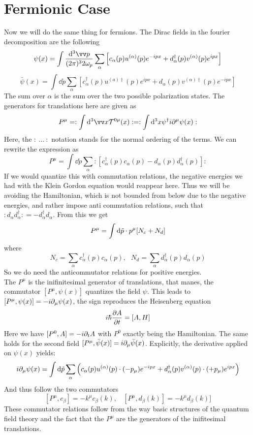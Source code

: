 \section{Fermionic Case}
Now we will do the same thing for fermions. 
The Dirac fields in the fourier decomposition are the following 
\[ \psi(x) = \int \frac{\dd ^3 \vp}{(2\pi)^3 2 \omega_p} \sum_\alpha \left[ c_\alpha(p) u^{(\alpha)}(p) e^{-ipx} + d_\alpha^\dagger(p) v^{(\alpha)}(p) e^{ipx}\right]\]
\[ \bar{\psi}(x) = \int \dd \tilde{p} \sum_\alpha \left[ c_\alpha^\dagger(p)u^{(a)\dagger}(p) e^{ipx} + d_\alpha(p) v^{(\alpha)\dagger}(p) e^{-ipx}\right] \]
The sum over $\alpha$ is the sum over the two possible polarization states.
The generators for translations here are given as
\[ P^\mu = : \int \dd^3\vx \mathcal{T}^{0\mu}(x) : = : \int \dd^3 x \psi^\dagger i \p^\mu \psi(x) :\]
Here, the $:~\ldots~:$ notation stands for the normal ordering of the terms. We can rewrite the expression as
\[ P^\mu = \int \dd \tilde{p} \sum_\alpha : \left[ c_\alpha^\dagger(p) c_\alpha(p) - d_\alpha(p) d_\alpha^\dagger(p) \right]:\]
If we would quantize this with commutation relations, the negative energies we had with the Klein Gordon equation would reappear here. Thus we will be avoiding the Hamiltonian, which is not bounded from below due to the negative energies, and rather impose anti commutation relations, such that $:d_\alpha d_\alpha^\dagger: = - d_\alpha^\dagger d_\alpha$. From this we get
\[ P^\mu = \int {\rm d} \tilde{p} \cdot p^\mu [ N_c + N_d]\]
where
\[ N_c = \sum_\alpha c_\alpha^\dagger (p) c_\alpha(p), ~~~ N_d = \sum_\alpha d_\alpha^\dagger (p) d_\alpha(p)\]
So we do need the anticommutator relations for positive energies.\\
The $P^\mu$ is the inifinitesimal generator of translations, that manes, the commutator $[P^\mu, \psi(x)]$ quantizes the field $\psi$. 
This leads to $[P^\mu , \psi(x)] = -i\partial_\mu \psi(x)$, the sign reproduces the Heisenberg equation 
\[ i \hbar \frac{\partial A}{\partial t} = [ A , H]\]
Here we have $[P^0, A] = - i \partial_t A$ with $P^0$ exactly being the Hamiltonian.
The same holds for the second field $ [P^\mu, \bar \psi(x) ] = i \partial_\mu \bar \psi(x)$.
Explicitly, the derivative applied on $\psi(x)$ yields:
\[ i \partial_\mu \psi(x) = \int {\rm d} \tilde p \sum_\alpha \left( c_\alpha(p) u^{(\alpha)} (p) \cdot (-p_\mu) e^{-ipx} + d_\alpha^\dagger(p) v^{(\alpha)}(p) \cdot  (+p_\mu)e^{ipx} \right)\]
And thus follow the two commutators
\[ [P^\mu, c_\beta] = - k^\mu c_\beta(k), ~~~~ [P^\mu, d_\beta(k)] = -k^\mu d_\beta(k)]\]
These commutator relations follow from the way basic structures of the quantum field theory and the fact that the $P^\mu$ are the generators of the inifitesimal translations.\\
